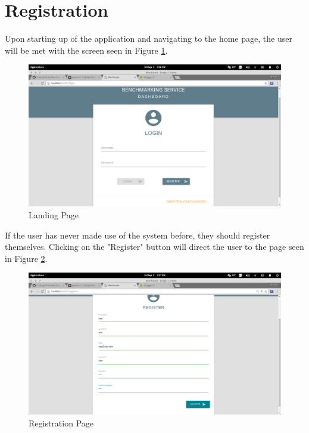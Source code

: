 \documentclass[11pt,a4paper]{article}
\begin{document}
\section{Registration}
Upon starting up of the application and navigating to the home page, the user will be met with the screen seen in 
Figure \ref{fig:landPage}.
\begin{figure}[H]
	\begin{center}
		\includegraphics[scale=0.3]{../Images/User Manual/Landing Page.png}
		\caption{Landing Page}
		\label{fig:landPage}
	\end{center}  
\end{figure}

\clearpage
If the user has never made use of the system before, they should register themselves. Clicking on the "Register"
button will direct the user to the page seen in Figure \ref{fig:regPage}.
\begin{figure}[H]
	\begin{center}
		\includegraphics[scale=0.3]{../Images/User Manual/Registration Page.png}
		\caption{Registration Page}
		\label{fig:regPage}
	\end{center}  
\end{figure}
\end{document}
